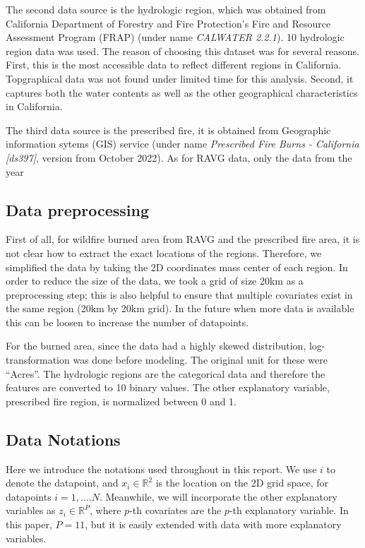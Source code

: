 \documentclass{article}
\begin{document}
The second data source is the hydrologic region, which was obtained from California Department of Forestry and Fire Protection's Fire and Resource Assessment Program (FRAP) (under name \textit{CALWATER 2.2.1}). 10 hydrologic region data was used. The reason of choosing this dataset was for several reasons. First, this is the most accessible data to reflect different regions in California. Topgraphical data was not found under limited time for this analysis. Second, it captures both the water contents as well as the other geographical characteristics in California. 

The third data source is the prescribed fire, it is obtained from Geographic information sytems (GIS) service (under name \textit{Prescribed Fire Burns - California [ds397]}, version from October 2022). As for RAVG data, only the data from the year 

\subsection*{Data preprocessing}
First of all, for wildfire burned area from RAVG and the prescribed fire area, it is not clear how to extract the exact locations of the regions. Therefore, we simplified the data by taking the 2D coordinates mass center of each region. In order to reduce the size of the data, we took a grid of size 20km as a preprocessing step; this is also helpful to ensure that multiple covariates exist in the same region (20km by 20km grid). In the future when more data is available this can be loosen to increase the number of datapoints. 

For the burned area, since the data had a highly skewed distribution, log-transformation was done before modeling. The original unit for these were ``Acres''. 
The hydrologic regions are the categorical data and therefore the features are converted to 10 binary values. The other explanatory variable, prescribed fire region, is normalized between 0 and 1.





\subsection*{Data Notations}
Here we introduce the notations used throughout in this report. We use $i$ to denote the datapoint, and $x_i \in \mathbb{R}^2$ is the location on the 2D grid space, for datapoints $i = 1,....N$. Meanwhile, we will incorporate the other explanatory variables as $z_i \in \mathbb{R}^P$, where $p$-th covariates are the $p$-th explanatory variable. In this paper, $P=11$, but it is easily extended with data with more explanatory variables. 
\end{document}
